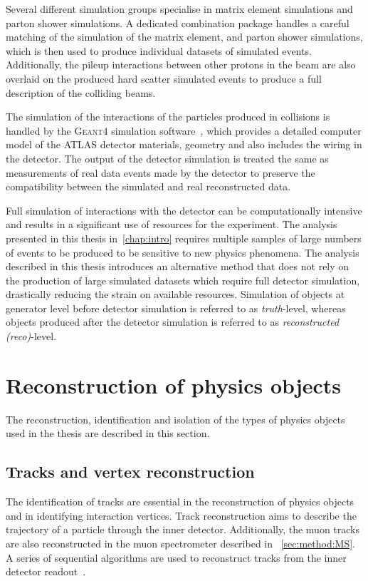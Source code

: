 Several different simulation groups specialise in matrix element simulations and parton shower simulations. A dedicated combination package handles a careful matching of the simulation of the matrix element, and parton shower simulations, which is then used to produce individual datasets of simulated events. Additionally, the pileup interactions between other protons in the beam are also overlaid on the produced hard scatter simulated events to produce a full description of the colliding beams. 

The simulation of the interactions of the particles produced in collisions is handled by the \textsc{Geant4} simulation software~\cite{Geant1,Geant2,Geant3}, which provides a detailed computer model of the ATLAS detector materials, geometry and also includes the wiring in the detector. The output of the detector simulation is treated the same as measurements of real data events made by the detector to preserve the compatibility between the simulated and real reconstructed data. 

Full simulation of interactions with the detector can be computationally intensive and results in a significant use of resources for the experiment. The analysis presented in this thesis in~\cref{chap:intro} requires multiple samples of large numbers of events to be produced to be sensitive to new physics phenomena. The analysis described in this thesis introduces an alternative method that does not rely on the production of large simulated datasets which require full detector simulation, drastically reducing the strain on available resources. Simulation of objects at generator level before detector simulation is referred to as \emph{truth}-level, whereas objects produced after the detector simulation is referred to as \emph{reconstructed (reco)}-level.

\section{Reconstruction of physics objects}\label{sec:reconstruction}
The reconstruction, identification and isolation of the types of physics objects used in the thesis are described in this section. 

\subsection{Tracks and vertex reconstruction}\label{sec:reconstruction:tracks}
The identification of tracks are essential in the reconstruction of physics objects and in identifying interaction vertices. Track reconstruction aims to describe the trajectory of a particle through the inner detector. Additionally, the muon tracks are also reconstructed in the muon spectrometer described in ~\cref{sec:method:MS}. A series of sequential algorithms are used to reconstruct tracks from the inner detector readout~\cite{ATLAS:tracking}. 

